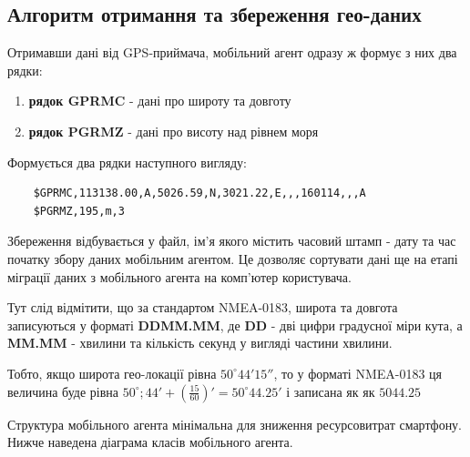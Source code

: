 \documentclass[simple,a4paper,14pt,ukrainian,utf8]{eskdtext}
\begin{document}
    \subsection{Алгоритм отримання та збереження гео-даних}
    
    Отримавши дані від GPS-приймача, мобільний агент одразу ж формує з них два рядки:
    
    \begin{enumerate}
    	\item \textbf{рядок GPRMC} - дані про широту та довготу
    	\item \textbf{рядок PGRMZ} - дані про висоту над рівнем моря
    \end{enumerate}
    
	Формується два рядки наступного вигляду:
	
	\begin{lstlisting}
	$GPRMC,113138.00,A,5026.59,N,3021.22,E,,,160114,,,A
	$PGRMZ,195,m,3
	\end{lstlisting}
    
    Збереження відбувається у файл, ім’я якого містить часовий штамп - дату та час початку збору даних мобільним агентом. Це дозволяє сортувати дані ще на етапі міграції даних з мобільного агента на комп’ютер користувача.
    
    Тут слід відмітити, що за стандартом NMEA-0183, широта та довгота записуються у форматі \textbf{DDMM.MM}, де \textbf{DD} - дві цифри градусної міри кута, а \textbf{MM.MM} - хвилини та кількість секунд у вигляді частини хвилини.
    
    Тобто, якщо широта гео-локації рівна $50^\circ 44' 15''$, то у форматі NMEA-0183 ця величина буде рівна $50^\circ; 44' + (\frac{15}{60})' = 50^\circ 44.25'$ і записана як як $5044.25$
    
    Структура мобільного агента мінімальна для зниження ресурсовитрат смартфону. Нижче наведена діаграма класів мобільного агента.
    
\end{document}
